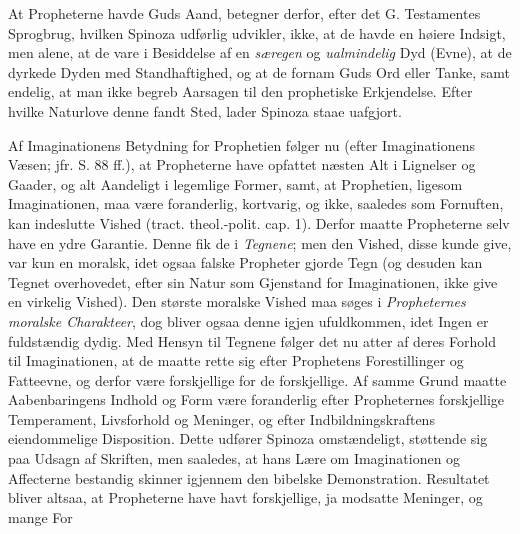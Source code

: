 \documentclass[12pt,a4paper]{book}
\newcommand{\opage}[1]{\marginnote{\footnotesize\textit{[#1]}}}
\begin{document}
At Propheterne havde Guds Aand, betegner derfor, efter det G. Testamentes Sprogbrug, hvilken Spinoza udførlig udvikler, ikke, at de havde en høiere Indsigt, men alene, at de vare i Besiddelse af en \emph{særegen} og \emph{ualmindelig} Dyd (Evne), at de dyrkede Dyden med Standhaftighed, og at de fornam Guds Ord eller Tanke, samt endelig, at man ikke begreb Aarsagen til den prophetiske Erkjendelse. Efter hvilke Naturlove denne fandt Sted, lader Spinoza staae uafgjort.

Af Imaginationens Betydning for Prophetien følger nu (efter Imaginationens Væsen; jfr. S. 88 ff.), at Propheterne have opfattet næsten Alt i Lignelser og Gaader, og alt Aandeligt i legemlige Former, samt, at Prophetien, ligesom Imaginationen, maa være foranderlig, kortvarig, og ikke, saaledes som Fornuften, kan indeslutte Vished (tract. theol.-polit. cap. 1). Derfor maatte Propheterne selv have en ydre Garantie. Denne fik de i \emph{Tegnene}; men den Vished, disse kunde give, var kun en moralsk, idet ogsaa falske Propheter gjorde Tegn (og desuden kan Tegnet overhovedet, efter sin Natur som Gjenstand for Imaginationen, ikke give en virkelig Vished). Den største moralske Vished maa søges i \emph{Propheternes moralske Charakteer}, dog bliver ogsaa denne igjen ufuldkommen, idet Ingen er fuldstændig dydig. Med Hensyn til Tegnene følger det nu atter af deres Forhold til Imaginationen, at de maatte rette sig efter Prophetens Forestillinger og Fatteevne, og derfor være forskjellige for de forskjellige. Af samme Grund maatte Aabenbaringens Indhold og Form være foranderlig efter Propheternes forskjellige Temperament, Livsforhold og Meninger, og efter Indbildningskraftens eiendommelige Disposition. Dette udfører Spinoza omstændeligt, støttende sig paa Udsagn af Skriften, men saaledes, at hans Lære om Imaginationen og Affecterne bestandig skinner igjennem den bibelske Demonstration. Resultatet bliver altsaa, at Propheterne have havt forskjellige, ja modsatte Meninger, og mange For\-%
\opage{152}\setcounter{footnote}{0}%
\end{document}
